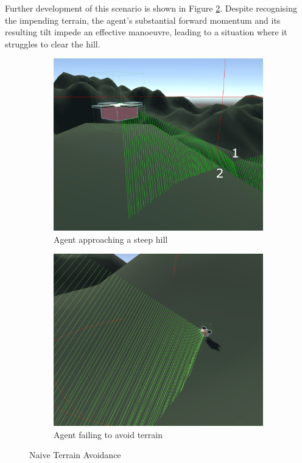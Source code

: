 \documentclass[12pt]{article}
\begin{document}
Further development of this scenario is shown in Figure \ref{fig:naive-ta-2}. Despite recognising the impending terrain, the agent's substantial forward momentum and its resulting tilt impede an effective manoeuvre, leading to a situation where it struggles to clear the hill.

\begin{figure}[ht]
    \centering
    \begin{subfigure}{0.45\textwidth}
        \centering
        \includegraphics[width=\linewidth]{naive-ta-edited.png}
        \caption{Agent approaching a steep hill}
        \label{fig:naive-ta-1}
    \end{subfigure}
    \hfill
    \begin{subfigure}{0.45\textwidth}
        \centering
        \includegraphics[width=\linewidth]{naive-ta-2.png}
        \caption{Agent failing to avoid terrain}
        \label{fig:naive-ta-2}
    \end{subfigure}
    \caption{Naive Terrain Avoidance}
    \label{fig:naive-ta-side-by-side}
\end{figure}
\end{document}
